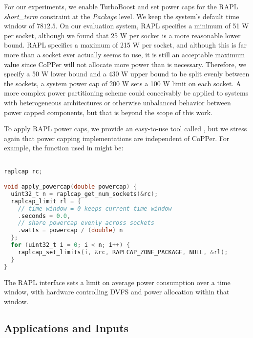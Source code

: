 For our experiments, we enable TurboBoost and set power caps for the RAPL \emph{short\_term} constraint at the \emph{Package} level.
We keep the system's default time window of $7812.5$\us. %
On our evaluation system, RAPL specifies a minimum of 51 W per socket, although we found that 25 W per socket is a more reasonable lower bound.
RAPL specifies a maximum of 215 W per socket, and although this is far more than a socket ever actually seems to use, it is still an acceptable maximum value since CoPPer will not allocate more power than is necessary.
Therefore, we specify a 50 W lower bound and a 430 W upper bound to be split evenly between the sockets, \eg a system power cap of 200 W sets a 100 W limit on each socket.
A more complex power partitioning scheme could conceivably be applied to systems with heterogeneous architectures or otherwise unbalanced behavior between power capped components, but that is beyond the scope of this work.

To apply RAPL power caps, we provide an easy-to-use tool called , but we stress again that power capping implementations are independent of CoPPer.
For example, the  function used in  might be:
%
\begin{lstlisting}[language=C,%
  caption={Applying a power cap with RAPLCap},%
  morekeywords={uint32_t, raplcap, raplcap_limit},%
  label={lst:example-powercap}]%

raplcap rc;

void apply_powercap(double powercap) {
  uint32_t n = raplcap_get_num_sockets(&rc);
  raplcap_limit rl = {
    // time window = 0 keeps current time window
    .seconds = 0.0,
    // share powercap evenly across sockets
    .watts = powercap / (double) n
  };
  for (uint32_t i = 0; i < n; i++) {
    raplcap_set_limits(i, &rc, RAPLCAP_ZONE_PACKAGE, NULL, &rl);
  }
}
\end{lstlisting}
The RAPL interface sets a limit on average power consumption over a time window, with hardware controlling DVFS and power allocation within that window.


\subsection{Applications and Inputs}
\label{sec:copper-inputs}

